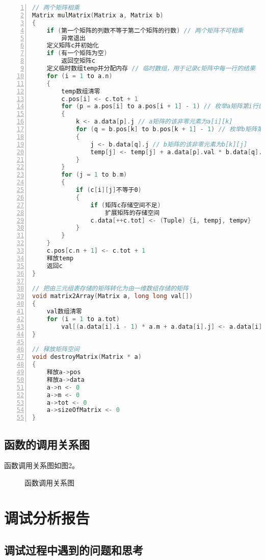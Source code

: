 \documentclass{article}
\begin{document}
\begin{lstlisting}[language={C},
    numbers=left,
    numberstyle=\tiny\consolas,
    basicstyle=\small\consolas]
// 两个矩阵相乘
Matrix mulMatrix(Matrix a, Matrix b)
{
    if (第一个矩阵的列数不等于第二个矩阵的行数) // 两个矩阵不可相乘
        异常退出
    定义矩阵c并初始化
    if (有一个矩阵为空)
        返回空矩阵c
    定义临时数组temp并分配内存 // 临时数组，用于记录c矩阵中每一行的结果
    for (i = 1 to a.n)
    {
        temp数组清零
        c.pos[i] <- c.tot + 1
        for (p = a.pos[i] to a.pos[i + 1] - 1) // 枚举a矩阵第i行的非零元素
        {
            k <- a.data[p].j // a矩阵的该非零元素为a[i][k]
            for (q = b.pos[k] to b.pos[k + 1] - 1) // 枚举b矩阵第k行的非零元素
            {
                j <- b.data[q].j // b矩阵的该非零元素为b[k][j]
                temp[j] <- temp[j] + a.data[p].val * b.data[q].val
            }
        }
        for (j = 1 to b.m)
        {
            if (c[i][j]不等于0) 
            {
                if (矩阵c存储空间不足)
                    扩展矩阵的存储空间
                c.data[++c.tot] <- (Tuple) {i, tempj, tempv}
            }
        }
    }
    c.pos[c.n + 1] <- c.tot + 1
    释放temp
    返回c
}

// 把由三元组表存储的矩阵转化为由一维数组存储的矩阵
void matrix2Array(Matrix a, long long val[])
{
    val数组清零
    for (i = 1 to a.tot)
        val[(a.data[i].i - 1) * a.m + a.data[i].j] <- a.data[i].val; // a[i][j]存储在val[(i-1]*m+j]中
}

// 释放矩阵空间
void destroyMatrix(Matrix * a)
{
    释放a->pos
    释放a->data
    a->n <- 0
    a->m <- 0
    a->tot <- 0
    a->sizeOfMatrix <- 0
}
\end{lstlisting}

\subsection{函数的调用关系图}

函数调用关系图如图2。

\begin{figure}[htbp]


    \caption{函数调用关系图}

\end{figure}

\section{调试分析报告}

\subsection{调试过程中遇到的问题和思考}
\end{document}
